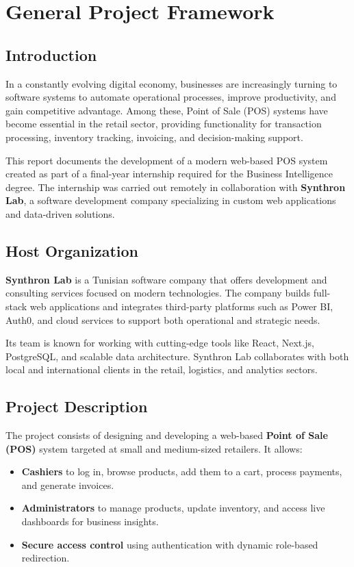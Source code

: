 \chapter{General Project Framework}

\section{Introduction}

In a constantly evolving digital economy, businesses are increasingly turning to software systems to automate operational processes, improve productivity, and gain competitive advantage. Among these, Point of Sale (POS) systems have become essential in the retail sector, providing functionality for transaction processing, inventory tracking, invoicing, and decision-making support.

This report documents the development of a modern web-based POS system created as part of a final-year internship required for the Business Intelligence degree. The internship was carried out remotely in collaboration with \textbf{Synthron Lab}, a software development company specializing in custom web applications and data-driven solutions.

\section{Host Organization}

\textbf{Synthron Lab} is a Tunisian software company that offers development and consulting services focused on modern technologies. The company builds full-stack web applications and integrates third-party platforms such as Power BI, Auth0, and cloud services to support both operational and strategic needs.

Its team is known for working with cutting-edge tools like React, Next.js, PostgreSQL, and scalable data architecture. Synthron Lab collaborates with both local and international clients in the retail, logistics, and analytics sectors.

\section{Project Description}

The project consists of designing and developing a web-based \textbf{Point of Sale (POS)} system targeted at small and medium-sized retailers. It allows:

\begin{itemize}
  \item \textbf{Cashiers} to log in, browse products, add them to a cart, process payments, and generate invoices.
  \item \textbf{Administrators} to manage products, update inventory, and access live dashboards for business insights.
  \item \textbf{Secure access control} using authentication with dynamic role-based redirection.
\end{itemize}

